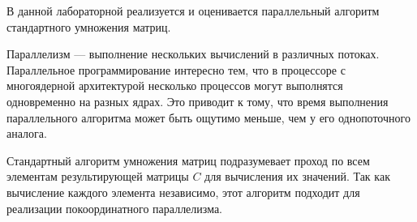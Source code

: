 В данной лабораторной реализуется и оценивается параллельный алгоритм стандартного умножения матриц.

Параллелизм --- выполнение нескольких вычислений в различных потоках. Параллельное программирование интересно тем, что в процессоре с многоядерной архитектурой несколько процессов могут выполнятся одновременно на разных ядрах. Это приводит к тому, что время выполнения параллельного алгоритма может быть ощутимо меньше, чем у его однопоточного аналога.

Стандартный алгоритм умножения матриц подразумевает проход по всем элементам результирующей матрицы $C$ для вычисления их значений. Так как вычисление каждого элемента независимо, этот алгоритм подходит для реализации покоординатного параллелизма.